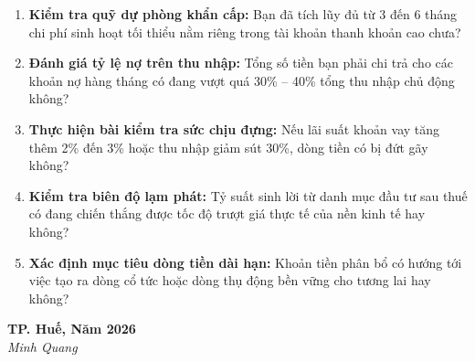 \documentclass[14pt, a4paper, oneside]{extreport}
\begin{document}
\begin{enumerate}
    \item \textbf{Kiểm tra quỹ dự phòng khẩn cấp:} Bạn đã tích lũy đủ từ 3 đến 6 tháng chi phí sinh hoạt tối thiểu nằm riêng trong tài khoản thanh khoản cao chưa?
    \item \textbf{Đánh giá tỷ lệ nợ trên thu nhập:} Tổng số tiền bạn phải chi trả cho các khoản nợ hàng tháng có đang vượt quá 30\% -- 40\% tổng thu nhập chủ động không?
    \item \textbf{Thực hiện bài kiểm tra sức chịu đựng:} Nếu lãi suất khoản vay tăng thêm 2\% đến 3\% hoặc thu nhập giảm sút 30\%, dòng tiền có bị đứt gãy không?
    \item \textbf{Kiểm tra biên độ lạm phát:} Tỷ suất sinh lời từ danh mục đầu tư sau thuế có đang chiến thắng được tốc độ trượt giá thực tế của nền kinh tế hay không?
    \item \textbf{Xác định mục tiêu dòng tiền dài hạn:} Khoản tiền phân bổ có hướng tới việc tạo ra dòng cổ tức hoặc dòng thụ động bền vững cho tương lai hay không?
\end{enumerate}

\vspace{1.5cm}
\begin{flushright}
\textbf{TP. Huế, Năm 2026} \\
\textit{Minh Quang}
\end{flushright}
\end{document}

